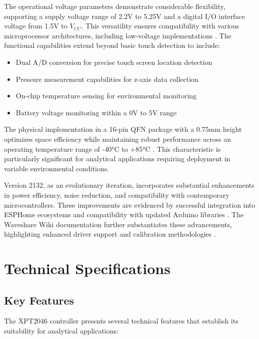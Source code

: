 The operational voltage parameters demonstrate considerable flexibility, supporting a supply voltage range of 2.2V to 5.25V and a digital I/O interface voltage from 1.5V to $V_{CC}$. This versatility ensures compatibility with various microprocessor architectures, including low-voltage implementations \cite{ xpt2046:2007}. The functional capabilities extend beyond basic touch detection to include:

\begin{itemize}
	\item Dual A/D conversion for precise touch screen location detection
	\item Pressure measurement capabilities for z-axis data collection
	\item On-chip temperature sensing for environmental monitoring
	\item Battery voltage monitoring within a 0V to 5V range
\end{itemize}

The physical implementation in a 16-pin QFN package with a 0.75mm height optimizes space efficiency while maintaining robust performance across an operating temperature range of -40°C to +85°C \cite{ xpt2046:2007}. This characteristic is particularly significant for analytical applications requiring deployment in variable environmental conditions.

Version 2132, as an evolutionary iteration, incorporates substantial enhancements in power efficiency, noise reduction, and compatibility with contemporary microcontrollers. These improvements are evidenced by successful integration into ESPHome ecosystems \cite{ESPHome:2024} and compatibility with updated Arduino libraries \cite{Stoffregen:2023}. The Waveshare Wiki documentation further substantiates these advancements, highlighting enhanced driver support and calibration methodologies \cite{Waveshare:2024}.

\section{Technical Specifications}
\subsection{Key Features}
The XPT2046 controller presents several technical features that establish its suitability for analytical applications:

